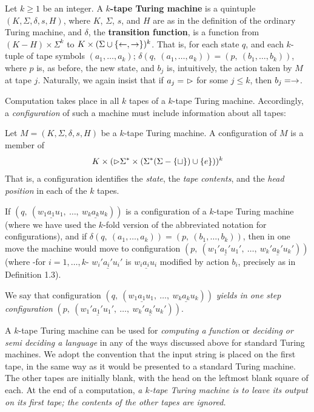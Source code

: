 \vspace*{\fill}
\columnbreak

\begin{definition}{}
  Let $k \geq 1$ be an integer. A \textbf{$k$-tape Turing machine} is a quintuple $(K, \Sigma, \delta, s, H)$, where $K$, $\Sigma$, $s$, and $H$ are as in the definition of the ordinary Turing machine, and $\delta$, the \textbf{transition function}, is a function from $(K - H) \times \Sigma^k$ to $K \times (\Sigma \cup \{ \leftarrow, \rightarrow \})^k$. That is, for each state $q$, and each $k$-tuple of tape symbols $(a_1, \ldots, a_k)$; $\delta(q,\ (a_1, \ldots, a_k)) = (p,\ (b_1, \ldots, b_k))$, where $p$ is, as before, the new state, and $b_j$ is, intuitively, the action taken by $M$ at tape $j$. Naturally, we again insist that if $a_j =\ \tar$ for some $j \leq k$, then $b_j = \rightarrow$. 
\end{definition}
Computation takes place in all $k$ tapes of a $k$-tape Turing machine. Accordingly, a \textit{configuration} of such a machine must include information about all 
tapes:
\begin{definition}{}
Let $M = (K, \Sigma, \delta, s, H)$ be a $k$-tape Turing machine. A configuration of $M$ is a member of
\begin{equation*}
  K \times ( {\vartriangleright}{\Sigma^*} \times (\Sigma^* (\Sigma - \{\sqcup\}) \cup \{ e \}))^k
\end{equation*}
That is, a configuration identifies the \textit{state}, the \textit{tape contents}, and the \textit{head position} in each of the $k$ tapes.
\end{definition}

If $(q,\ (w_1\underline{a_1}u_1,\ \ldots,\ w_k\underline{a_k}u_k))$ is a configuration of a $k$-tape Turing machine (where we have used the $k$-fold version of the abbreviated notation for configurations), and if $\delta(q,\ (a_1, \ldots, a_k)) = (p,\ (b_1, \ldots, b_k))$, then in one move the machine would move to configuration $(p,\ (w_1'\underline{a_1'}u_1',\ \ldots,\ w_k'\underline{a_k'}u_k'))$ (where -for $i = 1, \ldots, k$- $w_i'\underline{a_i'}u_i'$ is $w_i\underline{a_i}u_i$ modified by action $b_i$, precisely as in Definition 1.3). 

We say that configuration $(q,\ (w_1\underline{a_1}u_1,\ \ldots,\ w_k\underline{a_k}u_k))$ \textit{yields in one step configuration} $(p,\ (w_1'\underline{a_1'}u_1',\ \ldots,\ w_k'\underline{a_k'}u_k'))$.

A $k$-tape Turing machine can be used for \textit{computing a function} or \textit{deciding or semi deciding a language} in any of the ways discussed above for standard Turing machines. We adopt the convention that the input string is placed on the first tape, in the same way as it would be presented to a standard Turing machine. The other tapes are initially blank, with the head on the leftmost blank square of each. At the end of a computation, \textit{a $k$-tape Turing machine is to leave its output on its first tape; the contents of the other tapes are ignored.}

